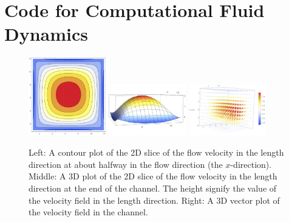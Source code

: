 \chapter{Code for Computational Fluid Dynamics}
\label{App:cfd}

\begin{frame}
	
	\begin{center}
	\end{center}
\end{frame}



\begin{figure}[H]
	\centering
	\captionsetup{width=1\textwidth}
	\includegraphics[width=0.3\textwidth]{figures/3D1.pdf}
	\includegraphics[width=0.3\textwidth]{figures/3D2.pdf}
	\includegraphics[width=0.3\textwidth]{figures/3D3.pdf}
	\caption
	{Left: A contour plot of the 2D slice of the flow velocity in the length direction at about halfway in the flow direction (the $x$-direction). Middle: A 3D plot of the 2D slice of the flow velocity in the length direction at the end of the channel. The height signify the value of the velocity field in the length direction. Right: A 3D vector plot of the velocity field in the channel.}
\end{figure}


